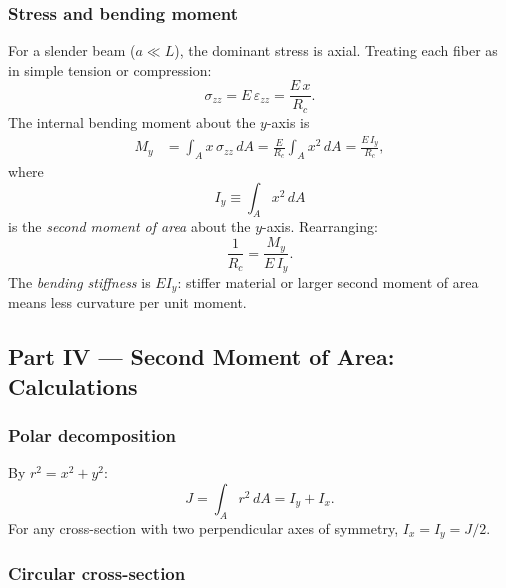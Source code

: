 \documentclass[../main.tex]{subfiles}
\begin{document}
\subsubsection*{Stress and bending moment}

For a slender beam ($a \ll L$), the dominant stress is axial. Treating each fiber as in simple tension or compression:
\begin{equation}
    \sigma_{zz} = E\,\varepsilon_{zz} = \frac{E\,x}{R_c}.
    \label{eq:lec08_bending_stress}
\end{equation}
The internal bending moment about the $y$-axis is
\begin{align}
    M_y &= \int_A x\,\sigma_{zz}\,dA
         = \frac{E}{R_c}\int_A x^2\,dA
         = \frac{E\,I_y}{R_c},
    \label{eq:lec08_bending_moment}
\end{align}
where
\begin{equation}
    I_y \equiv \int_A x^2\,dA
    \label{eq:lec08_second_moment_def}
\end{equation}
is the \emph{second moment of area} about the $y$-axis. Rearranging:
\begin{equation}
    \boxed{\frac{1}{R_c} = \frac{M_y}{E\,I_y}.}
    \label{eq:lec08_curvature_moment}
\end{equation}
The \emph{bending stiffness} is $EI_y$: stiffer material or larger second moment of area means less curvature per unit moment.

\subsection*{Part IV — Second Moment of Area: Calculations}

\subsubsection*{Polar decomposition}

By $r^2 = x^2 + y^2$:
\begin{equation}
    J = \int_A r^2\,dA = I_y + I_x.
    \label{eq:lec08_polar_decomposition}
\end{equation}
For any cross-section with two perpendicular axes of symmetry, $I_x = I_y = J/2$.

\subsubsection*{Circular cross-section}
\end{document}
